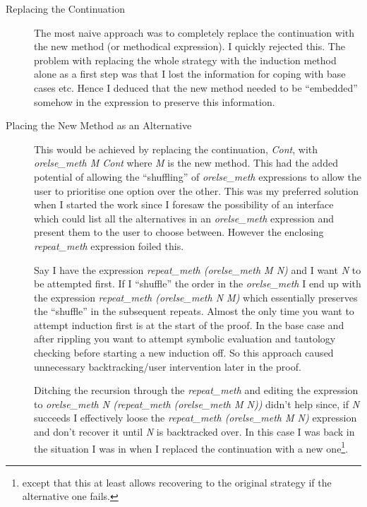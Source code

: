 \begin{description}
\item[Replacing the Continuation] The most naive approach was to
  completely replace the continuation with
  the new method (or methodical expression).  I quickly rejected this.
  The problem with replacing the whole strategy with the induction
  method alone as a first step was that I lost
  the information for coping with base cases etc.
  Hence I deduced that the new method needed to be ``embedded''
  somehow in the expression to preserve this information.

\item[Placing the New Method as an Alternative] This would be achieved 
  by replacing the continuation, {\em Cont}, with {\em orelse\_meth M
    Cont} where {\em M} is the new method.  This
  had the added 
  potential of allowing the ``shuffling'' of {\em orelse\_meth}
  expressions to allow the user to prioritise one option over the
  other.  This was my preferred solution when I started the work since
  I foresaw the possibility of an interface which could list all the
  alternatives in an {\em orelse\_meth} expression and present them to 
  the user to choose between.  However the enclosing {\em
     repeat\_meth} expression foiled this.  
   
   Say I have the expression {\em
     repeat\_meth (orelse\_meth M N)} and I want {\em N} to be
   attempted first.  If I ``shuffle'' the order in the {\em
     orelse\_meth} I end up with the expression
   {\em repeat\_meth (orelse\_meth N M)} which essentially preserves
   the ``shuffle'' in the subsequent repeats.
   Almost the only time you want to attempt induction
   first is at the start of the proof.  In the base case and after
   rippling you want to attempt symbolic
   evaluation and tautology
   checking before starting a new induction
   off.  So this approach caused unnecessary backtracking/user
   intervention later in the proof.

Ditching the recursion through the {\em
  repeat\_meth} and editing
the expression to {\em orelse\_meth N
  (repeat\_meth (orelse\_meth M N))} didn't help since, if {\em N}
succeeds I effectively loose the {\em repeat\_meth (orelse\_meth M N)
  } expression and don't recover it until {\em N} is backtracked over.
In this case I was back in the situation I was in when I replaced the
continuation with a new one\footnote{except that this at least allows
  recovering to the original strategy if the alternative one fails.}.


\end{description}
